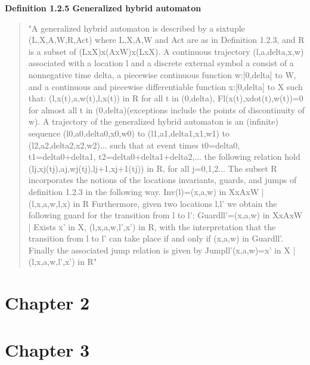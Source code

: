 \documentclass[12pt]{article}
\begin{document}
\textbf{Definition 1.2.5 Generalized hybrid automaton}
\begin{quote}
"A generalized hybrid automaton is described by a sixtuple (L,X,A,W,R,Act) where L,X,A,W and Act are as in Definition 1.2.3, and R is a subset of (LxX)x(AxW)x(LxX). A continuous trajectory (l,a,delta,x,w) associated with a location l and a discrete external symbol a consist of a nonnegative time delta, a piecewise continuous function w:[0,delta] to W, and a continuous and piecewise differentiable function x:[0,delta] to X such that:
(l,x(t),a,w(t),l,x(t)) in R for all t in (0,delta),
Fl(x(t),xdot(t),w(t))=0 for almost all t in (0,delta)(exceptions include the points of discontinuity of w).
A trajectory of the generalized hybrid automaton is an (infinite) sequence
(l0,a0,delta0,x0,w0) to (l1,a1,delta1,x1,w1) to (l2,a2,delta2,x2,w2)...
such that at event times
t0=delta0, t1=delta0+delta1, t2=delta0+delta1+delta2,...
the following relation hold
(lj,xj(tj),aj,wj(tj),lj+1,xj+1(tj)) in R, for all j=0,1,2...
The subset R incorporates the notions of the locations invariants, guards, and jumps of definition 1.2.3 in the following way.
Inv(l)={(x,a,w) in XxAxW | (l,x,a,w,l,x) in R}
Furthermore, given two locations l,l' we obtain the following guard for the transition from l to l':
Guardll'={(x,a,w) in XxAxW | Exists x' in X, (l,x,a,w,l',x') in R},
with the interpretation that the transition from l to l' can take place if and only if (x,a,w) in Guardll'. Finally the associated jump relation is given by
Jumpll'(x,a,w)={x' in X | (l,x,a,w,l',x') in R}"
\end{quote}
\section{Chapter 2}
\section{Chapter 3}



\clearpage


\end{document}
